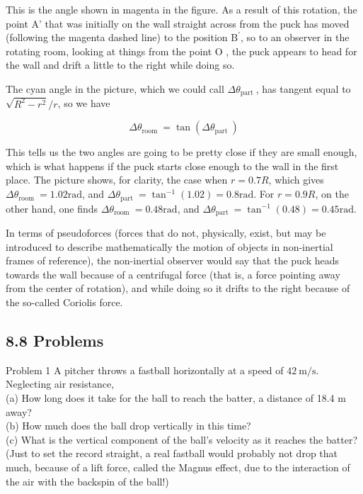 \documentclass[10pt]{article}
\begin{document}
This is the angle shown in magenta in the figure. As a result of this rotation, the point A' that was initially on the wall straight across from the puck has moved (following the magenta dashed line) to the position $\mathrm{B}^{\prime}$, so to an observer in the rotating room, looking at things from the point O , the puck appears to head for the wall and drift a little to the right while doing so.

The cyan angle in the picture, which we could call $\Delta \theta_{\text {part }}$, has tangent equal to $\sqrt{R^{2}-r^{2}} / r$, so we have


\begin{equation*}
\Delta \theta_{\text {room }}=\tan \left(\Delta \theta_{\text {part }}\right) \tag{8.64}
\end{equation*}


This tells us the two angles are going to be pretty close if they are small enough, which is what happens if the puck starts close enough to the wall in the first place. The picture shows, for clarity, the case when $r=0.7 R$, which gives $\Delta \theta_{\text {room }}=1.02 \mathrm{rad}$, and $\Delta \theta_{\text {part }}=\tan ^{-1}(1.02)=0.8 \mathrm{rad}$. For $r=0.9 R$, on the other hand, one finds $\Delta \theta_{\text {room }}=0.48 \mathrm{rad}$, and $\Delta \theta_{\text {part }}=\tan ^{-1}(0.48)=0.45 \mathrm{rad}$.

In terms of pseudoforces (forces that do not, physically, exist, but may be introduced to describe mathematically the motion of objects in non-inertial frames of reference), the non-inertial observer would say that the puck heads towards the wall because of a centrifugal force (that is, a force pointing away from the center of rotation), and while doing so it drifts to the right because of the so-called Coriolis force.

\subsection*{8.8 Problems}
Problem 1 A pitcher throws a fastball horizontally at a speed of $42 \mathrm{~m} / \mathrm{s}$. Neglecting air resistance,\\
(a) How long does it take for the ball to reach the batter, a distance of 18.4 m away?\\
(b) How much does the ball drop vertically in this time?\\
(c) What is the vertical component of the ball's velocity as it reaches the batter?\\
(Just to set the record straight, a real fastball would probably not drop that much, because of a lift force, called the Magnus effect, due to the interaction of the air with the backspin of the ball!)
\end{document}

